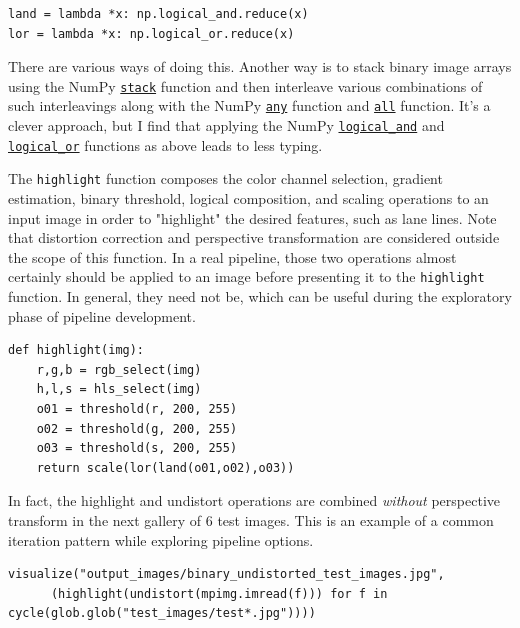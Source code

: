 \documentclass[11pt]{article}
\begin{document}
\begin{verbatim}
land = lambda *x: np.logical_and.reduce(x)
lor = lambda *x: np.logical_or.reduce(x)
\end{verbatim}

There are various ways of doing this.  Another way is to stack
binary image arrays using the NumPy \href{https://docs.scipy.org/doc/numpy/reference/generated/numpy.stack.html}{\texttt{stack}} function and then
interleave various combinations of such interleavings along with
the NumPy \href{https://docs.scipy.org/doc/numpy/reference/generated/numpy.any.html#numpy-any}{\texttt{any}} function and \href{https://docs.scipy.org/doc/numpy/reference/generated/numpy.all.html#numpy-all}{\texttt{all}} function.  It's a clever
approach, but I find that applying the NumPy \href{https://docs.scipy.org/doc/numpy/reference/generated/numpy.logical_and.html#numpy-logical-and}{\texttt{logical\_and}} and
\href{https://docs.scipy.org/doc/numpy/reference/generated/numpy.logical_or.html#numpy-logical-or}{\texttt{logical\_or}} functions as above leads to less typing.  

The \texttt{highlight} function composes the color channel selection,
gradient estimation, binary threshold, logical composition, and
scaling operations to an input image in order to "highlight" the
desired features, such as lane lines.  Note that distortion
correction and perspective transformation are considered outside
the scope of this function.  In a real pipeline, those two
operations almost certainly should be applied to an image before
presenting it to the \texttt{highlight} function.  In general, they
need not be, which can be useful during the exploratory phase of
pipeline development.

\begin{verbatim}
def highlight(img):
    r,g,b = rgb_select(img)
    h,l,s = hls_select(img)
    o01 = threshold(r, 200, 255)
    o02 = threshold(g, 200, 255)
    o03 = threshold(s, 200, 255)
    return scale(lor(land(o01,o02),o03))
\end{verbatim}

In fact, the highlight and undistort operations are combined
\emph{without} perspective transform in the next gallery of 6 test
images.  This is an example of a common iteration pattern while
exploring pipeline options.

\begin{verbatim}
visualize("output_images/binary_undistorted_test_images.jpg",
	  (highlight(undistort(mpimg.imread(f))) for f in cycle(glob.glob("test_images/test*.jpg"))))
\end{verbatim}
\end{document}
